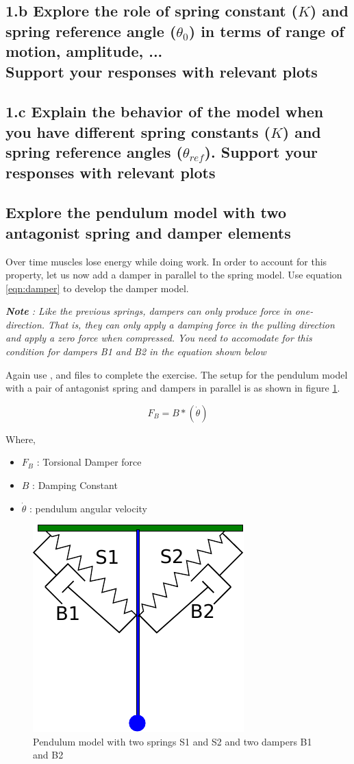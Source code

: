 \documentclass{cmc}
\begin{document}
\subsection*{1.b Explore the role of spring constant ($K$) and spring
  reference angle ($\theta_0$) in terms of range of motion, amplitude,
  ... \\ Support your responses with relevant plots }


\subsection*{1.c Explain the behavior of the model when you have
  different spring constants ($K$) and spring reference angles
  ($\theta_{ref}$). Support your responses with relevant plots}

\subsection*{Explore the pendulum model with two antagonist spring and damper elements}
Over time muscles lose energy while doing work. In order to account
for this property, let us now add a damper in parallel to the spring
model. Use equation \ref{eqn:damper} to develop the damper model.

\textit{\textbf{Note} : Like the previous springs, dampers can only
  produce force in one-direction.  That is, they can only apply a
  damping force in the pulling direction and apply a zero force when
  compressed. You need to accomodate for this condition for dampers B1
  and B2 in the equation shown below}

Again use ,  and
 files to complete the exercise. The
setup for the pendulum model with a pair of antagonist spring and
dampers in parallel is as shown in figure
\ref{fig:pendulum_spring_damper}.


\begin{equation}
  \label{eqn:damper}
  F_{B} = B*(\dot{\theta})
\end{equation}

Where,
\begin{itemize}
\item $F_{B}$ : Torsional Damper force
\item $B$ : Damping Constant
\item $\dot{\theta}$ : pendulum angular velocity
\end{itemize}


\begin{figure}[H]
  \centering
  \includegraphics[width=.3\textwidth]{figures/pendulum_spring_damper}
  \caption[pendulum with spring]{Pendulum model with two springs S1
    and S2 and two dampers B1 and B2}
  \label{fig:pendulum_spring_damper}
\end{figure}
\end{document}

